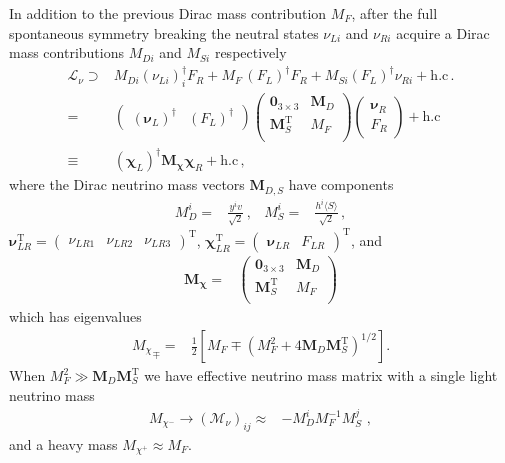 \begin{frame}
In addition to the previous Dirac mass contribution $M_F$, after the full spontaneous symmetry  breaking the neutral states $\nu_{Li}$ and $\nu_{Ri}$  acquire a Dirac mass contributions $M_{Di}$ and $M_{Si}$ respectively
\begin{align}
  \mathcal{L}_{\nu}\supset & M_{Di} \left( \nu_{Li} \right)^{\dagger}_i  F_R 
  + M_F\, \left( F_L \right)^{\dagger}  F_R + M_{Si} \left( F_L \right)^{\dagger}  \nu_{Ri}+   \text{h.c}\,. \nonumber\\
  =&\begin{pmatrix} \left( \boldsymbol{\nu}_{L} \right)^\dagger  & \left( F_L \right)^{\dagger}  \end{pmatrix}
 \begin{pmatrix}
   \mathbf{0}_{3 \times 3} &            \boldsymbol{M}_D \\
   \boldsymbol{M}_S^{\operatorname{T}} & M_F \\
 \end{pmatrix}
\begin{pmatrix} \boldsymbol{\nu}_{R}  \\
    F_R  \end{pmatrix}+\text{h.c} \nonumber\\
  \equiv& \left( \boldsymbol{\chi}_L \right)^\dagger \boldsymbol{M_{\chi}} \boldsymbol{\chi}_R+\text{h.c}\,,
\end{align}
where the Dirac neutrino mass vectors $\boldsymbol{M}_{D,S}$ have components
\begin{align}
  M_D^i=&\frac{y^i v}{\sqrt{2}}\,,&   M_S^i=&\frac{h^i \langle S\rangle}{\sqrt{2}}\,,
\end{align}
 $\boldsymbol{\nu}_{LR}^{\operatorname{T}}=
\begin{pmatrix}\nu_{LR1} & \nu_{LR2} & \nu_{LR3} \end{pmatrix}^{\operatorname{T}}$, $\boldsymbol{\chi}_{LR}^{\operatorname{T}}=\begin{pmatrix} \boldsymbol{\nu}_{LR}  & F_{LR}  \end{pmatrix}^{\operatorname{T}}$, and
\begin{align}
  \boldsymbol{M_{\chi}}=& \begin{pmatrix}
   \mathbf{0}_{3 \times 3} &            \boldsymbol{M}_D \\
   \boldsymbol{M}_S^{\operatorname{T}} & M_F \\
 \end{pmatrix}
\end{align}
which has eigenvalues
\begin{align}
{  {M_{\chi}}}_\mp=&\frac{1}{2} \left[ M_F \mp \left( M_F^2 + 4   \boldsymbol{M}_D   \boldsymbol{M}_S^{\operatorname{T}}  \right)^{1/2} \right].
\end{align}
When $M_F^2 \gg \boldsymbol{M}_D  \boldsymbol{M}_S ^{\operatorname{T}} $ we have effective neutrino mass matrix with a single light neutrino mass
\begin{align}
M_{\chi^-}\to  \left( \mathcal{M}_{\nu} \right)_{ij} \approx&-   M_D^i M_F^{-1} M_S^j\,     \,,
\end{align}
and a heavy mass $ M_{\chi^+} \approx M_F$.


\end{frame}
